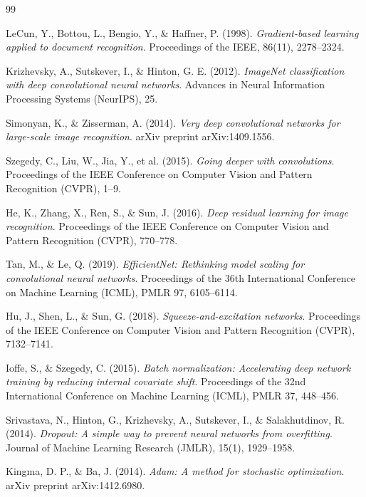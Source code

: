 \documentclass[12pt,a4paper,openany]{report}
\begin{document}
\begin{thebibliography}{99}

LeCun, Y., Bottou, L., Bengio, Y., \& Haffner, P. (1998).
\textit{Gradient-based learning applied to document recognition}.
Proceedings of the IEEE, 86(11), 2278--2324.

Krizhevsky, A., Sutskever, I., \& Hinton, G. E. (2012).
\textit{ImageNet classification with deep convolutional neural networks}.
Advances in Neural Information Processing Systems (NeurIPS), 25.

Simonyan, K., \& Zisserman, A. (2014).
\textit{Very deep convolutional networks for large-scale image recognition}.
arXiv preprint arXiv:1409.1556.

Szegedy, C., Liu, W., Jia, Y., et al. (2015).
\textit{Going deeper with convolutions}.
Proceedings of the IEEE Conference on Computer Vision and Pattern Recognition (CVPR), 1--9.

He, K., Zhang, X., Ren, S., \& Sun, J. (2016).
\textit{Deep residual learning for image recognition}.
Proceedings of the IEEE Conference on Computer Vision and Pattern Recognition (CVPR), 770--778.

Tan, M., \& Le, Q. (2019).
\textit{EfficientNet: Rethinking model scaling for convolutional neural networks}.
Proceedings of the 36th International Conference on Machine Learning (ICML), PMLR 97, 6105--6114.

Hu, J., Shen, L., \& Sun, G. (2018).
\textit{Squeeze-and-excitation networks}.
Proceedings of the IEEE Conference on Computer Vision and Pattern Recognition (CVPR), 7132--7141.

Ioffe, S., \& Szegedy, C. (2015).
\textit{Batch normalization: Accelerating deep network training by reducing internal covariate shift}.
Proceedings of the 32nd International Conference on Machine Learning (ICML), PMLR 37, 448--456.

Srivastava, N., Hinton, G., Krizhevsky, A., Sutskever, I., \& Salakhutdinov, R. (2014).
\textit{Dropout: A simple way to prevent neural networks from overfitting}.
Journal of Machine Learning Research (JMLR), 15(1), 1929--1958.

Kingma, D. P., \& Ba, J. (2014).
\textit{Adam: A method for stochastic optimization}.
arXiv preprint arXiv:1412.6980.


\end{thebibliography}
\end{document}
